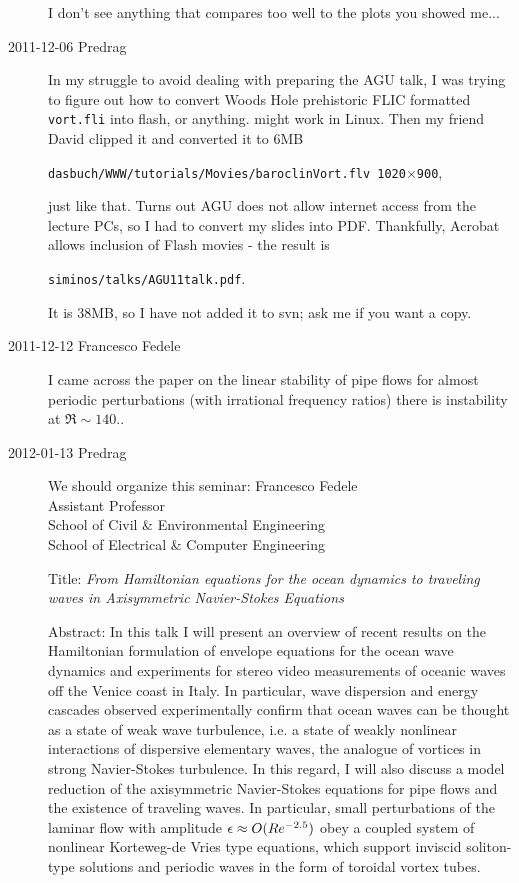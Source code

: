 \begin{description}
I don't see anything that compares too well to the plots you showed me...

\item[2011-12-06 Predrag] In my struggle to avoid dealing with preparing the
AGU talk, I was trying to figure out how to convert Woods Hole prehistoric
FLIC formatted \texttt{vort.fli} into flash, or anything.
 might work in Linux.
Then my friend David clipped it and converted it to 6MB

\texttt{dasbuch/WWW/tutorials/Movies/baroclinVort.flv 1020$\times$900},

\noindent
just like that. Turns out AGU does not allow internet access from the
lecture PCs, so I had to convert my
 slides
into PDF. Thankfully, Acrobat allows inclusion of Flash movies - the
result is

\texttt{siminos/talks/AGU11talk.pdf}.

\noindent
It is 38MB, so I have not
added it to svn; ask me if you want a copy.

	
\item[2011-12-12 Francesco Fedele]
I came across the  paper on the linear stability of pipe flows for
almost periodic perturbations (with irrational frequency ratios) there is
instability at $\Re \sim 140$..

\item[2012-01-13 Predrag] We should organize this  seminar:
Francesco Fedele\\
Assistant Professor\\
School of Civil \& Environmental Engineering\\
School of Electrical \& Computer Engineering

Title: \emph{From Hamiltonian equations for the ocean dynamics to
traveling waves in Axisymmetric Navier-Stokes Equations}

Abstract:
In this talk I will present an overview of recent results on the
Hamiltonian formulation of envelope equations for the ocean wave dynamics
and experiments for stereo video measurements of oceanic waves off the
Venice coast in Italy. In particular, wave dispersion and energy cascades
observed experimentally confirm that ocean waves can be thought as a
state of weak wave turbulence, i.e. a state of weakly nonlinear
interactions of dispersive elementary waves, the analogue of vortices in
strong Navier-Stokes turbulence. In this regard, I will also discuss a
model reduction of the axisymmetric Navier-Stokes equations for pipe
flows and the existence of traveling waves. In particular, small
perturbations of the laminar flow with amplitude $\epsilon\approx O(Re^{-2.5})$ obey a
coupled system of nonlinear Korteweg-de Vries type equations, which
support inviscid soliton-type solutions and periodic waves in the form of
toroidal vortex tubes.


\end{description}
